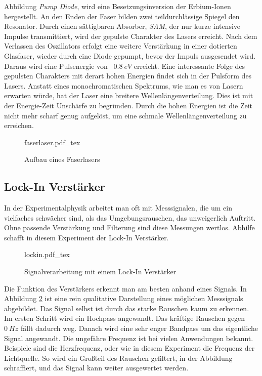 Abbildung \emph{Pump Diode}, wird eine Besetzungsinversion der Erbium-Ionen
hergestellt. An den Enden der Faser bilden zwei teildurchlässige Spiegel den 
Resonator. Durch einen sättigbaren Absorber, \emph{SAM}, der nur kurze intensive
Impulse transmittiert, wird der gepulste Charakter des Lasers erreicht. Nach dem 
Verlassen des Oszillators erfolgt eine weitere Verstärkung in einer dotierten 
Glasfaser, wieder durch eine Diode gepumpt, bevor der Impuls ausgesendet wird. 
Daraus wird eine Pulsenergie von ~$\SI{0,8}{eV}$ erreicht.
Eine interessante Folge des gepulsten Charakters mit derart hohen Energien findet
sich in der Pulsform des Lasers. Anstatt eines monochromatischen Spektrums, wie 
man es von Lasern erwarten würde, hat der Laser eine breitere
Wellenlängenverteilung. Dies ist mit der Energie-Zeit Unschärfe zu begründen.
Durch die hohen Energien ist die Zeit nicht mehr scharf genug aufgelöst, um 
eine schmale Wellenlängenverteilung zu erreichen.
\autocite{phying, zinth}
\begin{figure}[H]
  \centering
  {faserlaser.pdf_tex}
  \caption{Aufbau eines Faserlasers}
  \label{abb:faser}
\end{figure}


    \subsection{Lock-In Verstärker}

In der Experimentalphysik arbeitet man oft mit Messsignalen, die um ein 
vielfaches schwächer sind, als das Umgebungsrauschen, das unweigerlich
Auftritt. Ohne passende Verstärkung und Filterung sind diese Messungen wertlos.
Abhilfe schafft in diesem Experiment der Lock-In Verstärker. 
\begin{figure}[hb]
  \centering
  {lockin.pdf_tex}
  \caption{Signalverarbeitung mit einem Lock-In Verstärker}
  \label{abb:lockin}
\end{figure}
Die Funktion des Verstärkers erkennt man am besten anhand eines Signals. In 
Abbildung \ref{abb:lockin} ist eine rein qualitative Darstellung eines möglichen
Messsignals abgebildet. Das Signal selbst ist durch das starke Rauschen kaum zu
erkennen. Im ersten Schritt wird ein Hochpass angewandt. Das kräftige Rauschen
gegen $\SI{0}{Hz}$ fällt dadurch weg. Danach wird eine sehr enger Bandpass um
das eigentliche Signal angewandt. Die ungefähre Frequenz ist bei vielen Anwendungen
bekannt. Beispiele sind die Herzfrequenz, oder wie in diesem Experiment die 
Frequenz der Lichtquelle. So wird ein Großteil des Rauschen gefiltert, in der 
Abbildung schraffiert, und das Signal kann weiter ausgewertet werden.

